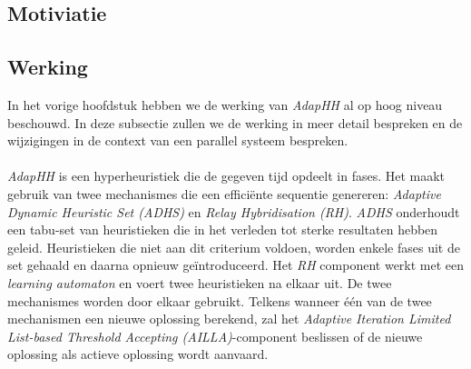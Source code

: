 \subsection{Motiviatie}

\subsection{Werking}

In het vorige hoofdstuk hebben we de werking van \emph{AdapHH} al op hoog niveau beschouwd. In deze subsectie zullen we de werking in meer detail bespreken en de wijzigingen in de context van een parallel systeem bespreken.

\paragraph{}
\emph{AdapHH} is een hyperheuristiek die de gegeven tijd opdeelt in fases. Het maakt gebruik van twee mechanismes die een effici\"ente sequentie genereren: \emph{Adaptive Dynamic Heuristic Set (ADHS)} en \emph{Relay Hybridisation (RH)}. \emph{ADHS} onderhoudt een tabu-set van heuristieken die in het verleden tot sterke resultaten hebben geleid. Heuristieken die niet aan dit criterium voldoen, worden enkele fases uit de set gehaald en daarna opnieuw ge\"introduceerd. Het \emph{RH} component werkt met een \emph{learning automaton}\cite{learningAutomaton} en voert twee heuristieken na elkaar uit. De twee mechanismes worden door elkaar gebruikt. Telkens wanneer \'e\'en van de twee mechanismen een nieuwe oplossing berekend, zal het \emph{Adaptive Iteration Limited List-based Threshold Accepting (AILLA)}-component beslissen of de nieuwe oplossing als actieve oplossing wordt aanvaard.

